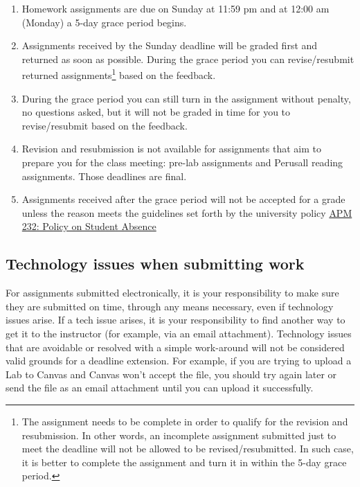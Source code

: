 \begin{enumerate}
\def\labelenumi{\arabic{enumi}.}
\tightlist
\item
  Homework assignments are due on Sunday at 11:59 pm and at 12:00 am
  (Monday) a 5-day grace period begins.
\item
  Assignments received by the Sunday deadline will be graded first and
  returned as soon as possible. During the grace period you can
  revise/resubmit returned assignments\footnote{The assignment needs to
    be complete in order to qualify for the revision and resubmission.
    In other words, an incomplete assignment submitted just to meet the
    deadline will not be allowed to be revised/resubmitted. In such
    case, it is better to complete the assignment and turn it in within
    the 5-day grace period.} based on the feedback.
\item
  During the grace period you can still turn in the assignment without
  penalty, no questions asked, but it will not be graded in time for you
  to revise/resubmit based on the feedback.
\item
  Revision and resubmission is not available for assignments that aim to
  prepare you for the class meeting: pre-lab assignments and Perusall
  reading assignments. Those deadlines are final.
\item
  Assignments received after the grace period will not be accepted for a
  grade unless the reason meets the guidelines set forth by the
  university policy
  \href{http://www.fresnostate.edu/academics/facultyaffairs/documents/apm/232.pdf}{APM
  232: Policy on Student Absence}
\end{enumerate}

\hypertarget{technology-issues-when-submitting-work}{%
\subsection{Technology issues when submitting
work}\label{technology-issues-when-submitting-work}}

For assignments submitted electronically, it is your responsibility to
make sure they are submitted on time, through any means necessary, even
if technology issues arise. If a tech issue arises, it is your
responsibility to find another way to get it to the instructor (for
example, via an email attachment). Technology issues that are avoidable
or resolved with a simple work-around will not be considered valid
grounds for a deadline extension. For example, if you are trying to
upload a Lab to Canvas and Canvas won't accept the file, you should try
again later or send the file as an email attachment until you can upload
it successfully.

